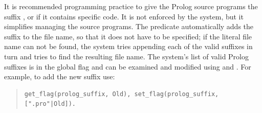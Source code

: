 It is recommended programming practice to give the Prolog source programs
the suffix , or  if it contains {\eclipse} specific
code.
It is not enforced by the system, but it simplifies managing the source
programs.
The  predicate
automatically adds the suffix to the
file name, so that it does not have to be specified;
if the literal file name can not be found, the system tries appending
each of the valid suffixes in turn and tries to find the resulting file name.
The system's list of valid Prolog suffixes is in the global flag
 and can be examined and modified
using  and
.
For example, to add the new suffix  use:
\begin{quote}
\begin{verbatim}
get_flag(prolog_suffix, Old), set_flag(prolog_suffix, [".pro"|Old]).
\end{verbatim}
\end{quote}

